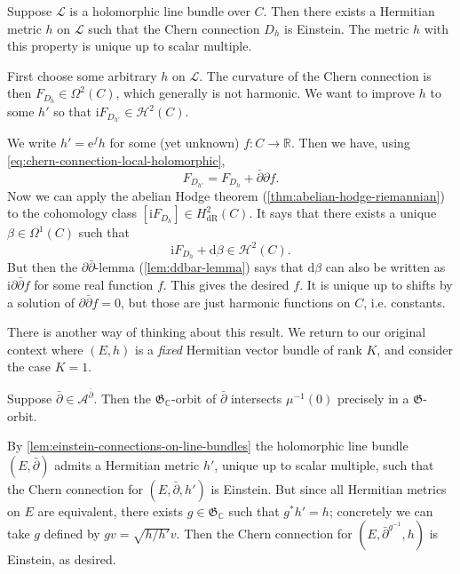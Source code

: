 \documentclass[12pt,letterpaper,reqno]{article}
\numberwithin{equation}{section}
\newcommand{\fG}{{\mathfrak G}}
\newcommand{\cL}{\ensuremath{\mathcal L}}
\newcommand{\cH}{\ensuremath{\mathcal H}}
\newcommand{\cA}{\ensuremath{\mathcal A}}
\newcommand{\R}{\ensuremath{\mathbb R}}
\newcommand{\C}{\ensuremath{\mathbb C}}
\newcommand{\I}{{\mathrm i}}
\newcommand{\e}{{\mathrm e}}
\newcommand{\de}{\mathrm{d}}
\newcommand{\dR}{\mathrm{dR}}
\newcommand{\ti}[1]{\textit{#1}}
\begin{document}
\begin{lem} \label{lem:einstein-connections-on-line-bundles}
Suppose $\cL$ is a holomorphic line bundle over $C$. Then there
exists a Hermitian metric $h$ on $\cL$ such that the Chern
connection $D_h$ is Einstein. The metric $h$ with this property
is unique up to scalar multiple.
\end{lem}
\begin{pf}
First choose some arbitrary $h$ on $\cL$. The curvature of the Chern
connection is then $F_{D_h} \in \Omega^2(C)$,
which generally is not harmonic. We want to
improve $h$ to some $h'$ so that $\I F_{D_{h'}} \in \cH^2(C)$.

We write $h' = \e^f h$ for some (yet unknown) $f: C \to \R$.
Then we have, using \eqref{eq:chern-connection-local-holomorphic},
\begin{equation}
  F_{D_{h'}} = F_{D_h} + \bar\partial \partial f.
\end{equation}
Now we can apply the
abelian Hodge theorem (\autoref{thm:abelian-hodge-riemannian})
to the cohomology class $[\I F_{D_h}] \in H^{2}_\dR(C)$.
It says that there exists a unique $\beta \in \Omega^1(C)$
such that
\begin{equation}
 \I F_{D_h} + \de \beta \in \cH^2(C).
\end{equation}
But then the $\partial \bar\partial$-lemma (\autoref{lem:ddbar-lemma})
says that $\de \beta$ can also be written as
$\I \partial \bar\partial f$ for some real function $f$.
This gives the desired $f$. It is unique up to shifts by
a solution of $\partial \bar\partial f = 0$, but those
are just harmonic functions on $C$, i.e. constants.
\end{pf}

There is another way of thinking about this result.
We return to our original context where $(E,h)$ is a \ti{fixed}
Hermitian vector bundle of rank $K$, and consider the case $K=1$.

\begin{cor}
Suppose $\bar\partial \in \cA^{\bar\partial}$.
Then the $\fG_\C$-orbit of $\bar\partial$
intersects $\mu^{-1}(0)$ precisely
in a $\fG$-orbit.
\end{cor}

\begin{pf} By \autoref{lem:einstein-connections-on-line-bundles}
the holomorphic line bundle $(E,\bar\partial)$ admits
a Hermitian metric $h'$, unique up to scalar multiple,
such that the Chern connection
for $(E, \bar\partial, h')$ is Einstein.
But since all Hermitian metrics on $E$ are equivalent, there
exists $g \in \fG_\C$ such that $g^* h' = h$;
concretely we can take $g$ defined by $g v = \sqrt{h/h'} v$.
Then the Chern connection for
$(E,\bar\partial^{g^{-1}}, h)$ is Einstein, as desired.
\end{pf}
\end{document}
